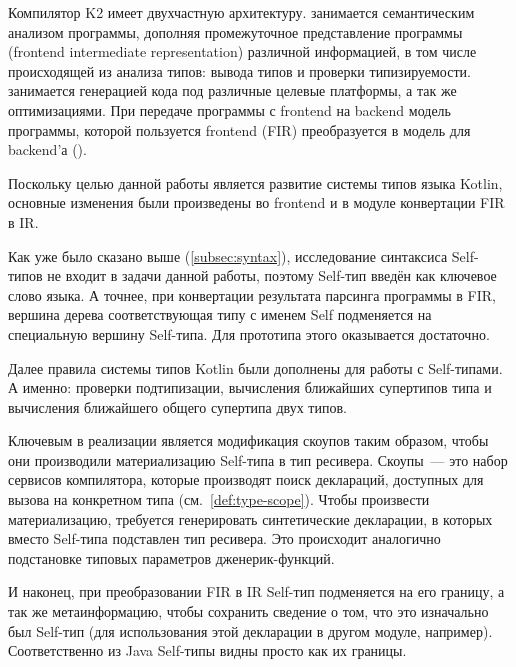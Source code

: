 Компилятор K2 имеет двухчастную архитектуру.
 занимается семантическим анализом программы, дополняя промежуточное представление программы  (frontend intermediate representation) различной информацией, в том числе происходящей из анализа типов: вывода типов и проверки типизируемости.
 занимается генерацией кода под различные целевые платформы, а так же оптимизациями.
При передаче программы с frontend на backend модель программы, которой пользуется frontend (FIR) преобразуется в модель для backend'а ().

Поскольку целью данной работы является развитие системы типов языка Kotlin, основные изменения были произведены во frontend и в модуле конвертации FIR в IR.

Как уже было сказано выше (\ref{subsec:syntax}), исследование синтаксиса Self-типов не входит в задачи данной работы, поэтому Self-тип введён как ключевое слово языка.
А точнее, при конвертации результата парсинга программы в FIR, вершина дерева соответствующая типу с именем Self подменяется на специальную вершину Self-типа.
Для прототипа этого оказывается достаточно.

Далее правила системы типов Kotlin были дополнены для работы с Self-типами.
А именно: проверки подтипизации, вычисления ближайших супертипов типа и вычисления ближайшего общего супертипа двух типов.

Ключевым в реализации является модификация скоупов таким образом, чтобы они производили материализацию Self-типа в тип ресивера.
Скоупы~--- это набор сервисов компилятора, которые производят поиск деклараций, доступных для вызова на конкретном типа (см.~\ref{def:type-scope}).
Чтобы произвести материализацию, требуется генерировать синтетические декларации, в которых вместо Self-типа подставлен тип ресивера.
Это происходит аналогично подстановке типовых параметров дженерик-функций.

И наконец, при преобразовании FIR в IR Self-тип подменяется на его границу, а так же метаинформацию, чтобы сохранить сведение о том, что это изначально был Self-тип (для использования этой декларации в другом модуле, например).
Соответственно из Java Self-типы видны просто как их границы.
